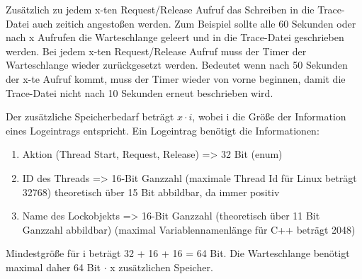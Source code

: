 \begin{itemize}
  Zusätzlich zu jedem x-ten Request/Release Aufruf das Schreiben in die
  Trace-Datei auch zeitich angestoßen werden. Zum Beispiel sollte alle 60
  Sekunden oder nach x Aufrufen die Warteschlange geleert und in die
  Trace-Datei geschrieben werden. Bei jedem x-ten Request/Release Aufruf muss
  der Timer der Warteschlange wieder zurückgesetzt werden. Bedeutet wenn nach
  50 Sekunden der x-te Aufruf kommt, muss der Timer wieder von vorne beginnen,
  damit die Trace-Datei nicht nach 10 Sekunden erneut beschrieben wird.

  Der zusätzliche Speicherbedarf beträgt $x \cdot i$, wobei i die Größe der
  Information eines Logeintrags entspricht. Ein Logeintrag benötigt die
  Informationen:
  \begin{enumerate}
    \item Aktion (Thread Start, Request, Release) => 32 Bit (enum)
    \item ID des Threads => 16-Bit Ganzzahl (maximale Thread Id für Linux
    beträgt 32768) theoretisch über 15 Bit abbildbar, da immer positiv
    \item Name des Lockobjekts => 16-Bit Ganzzahl (theoretisch über 11 Bit
    Ganzzahl abbildbar) (maximal Variablennamenlänge für C++ beträgt 2048)
  \end{enumerate}
  Mindestgröße für i beträgt 32 + 16 + 16 = 64 Bit. Die Warteschlange benötigt
  maximal daher 64 Bit $\cdot$ x zusätzlichen Speicher.
\end{itemize}